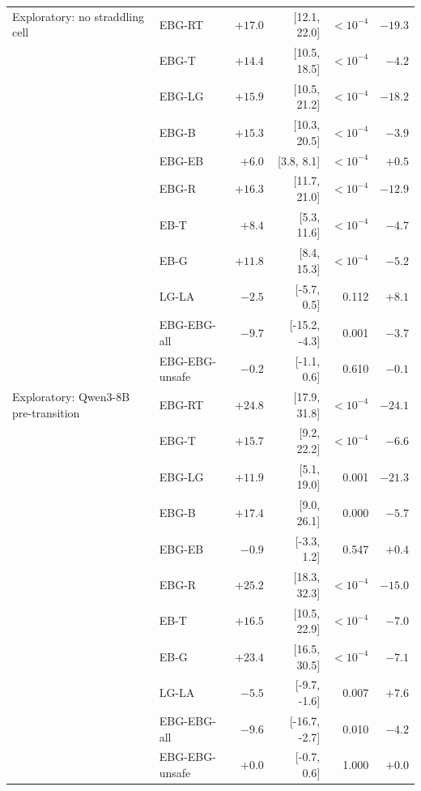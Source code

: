 \begin{longtable}{@{}llrrrr@{}}
\midrule
Exploratory: no straddling cell & EBG-RT & $+17.0$ & [12.1, 22.0] & $<10^{-4}$ & $-19.3$ \\
 & EBG-T & $+14.4$ & [10.5, 18.5] & $<10^{-4}$ & $-4.2$ \\
 & EBG-LG & $+15.9$ & [10.5, 21.2] & $<10^{-4}$ & $-18.2$ \\
 & EBG-B & $+15.3$ & [10.3, 20.5] & $<10^{-4}$ & $-3.9$ \\
 & EBG-EB & $+6.0$ & [3.8, 8.1] & $<10^{-4}$ & $+0.5$ \\
 & EBG-R & $+16.3$ & [11.7, 21.0] & $<10^{-4}$ & $-12.9$ \\
 & EB-T & $+8.4$ & [5.3, 11.6] & $<10^{-4}$ & $-4.7$ \\
 & EB-G & $+11.8$ & [8.4, 15.3] & $<10^{-4}$ & $-5.2$ \\
 & LG-LA & $-2.5$ & [-5.7, 0.5] & 0.112 & $+8.1$ \\
 & EBG-EBG-all & $-9.7$ & [-15.2, -4.3] & 0.001 & $-3.7$ \\
 & EBG-EBG-unsafe & $-0.2$ & [-1.1, 0.6] & 0.610 & $-0.1$ \\
\midrule
Exploratory: Qwen3-8B pre-transition & EBG-RT & $+24.8$ & [17.9, 31.8] & $<10^{-4}$ & $-24.1$ \\
 & EBG-T & $+15.7$ & [9.2, 22.2] & $<10^{-4}$ & $-6.6$ \\
 & EBG-LG & $+11.9$ & [5.1, 19.0] & 0.001 & $-21.3$ \\
 & EBG-B & $+17.4$ & [9.0, 26.1] & 0.000 & $-5.7$ \\
 & EBG-EB & $-0.9$ & [-3.3, 1.2] & 0.547 & $+0.4$ \\
 & EBG-R & $+25.2$ & [18.3, 32.3] & $<10^{-4}$ & $-15.0$ \\
 & EB-T & $+16.5$ & [10.5, 22.9] & $<10^{-4}$ & $-7.0$ \\
 & EB-G & $+23.4$ & [16.5, 30.5] & $<10^{-4}$ & $-7.1$ \\
 & LG-LA & $-5.5$ & [-9.7, -1.6] & 0.007 & $+7.6$ \\
 & EBG-EBG-all & $-9.6$ & [-16.7, -2.7] & 0.010 & $-4.2$ \\
 & EBG-EBG-unsafe & $+0.0$ & [-0.7, 0.6] & 1.000 & $+0.0$ \\
\end{longtable}
